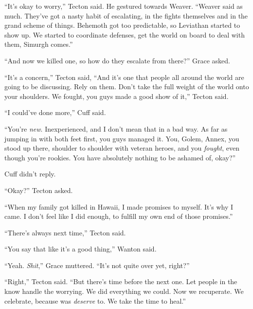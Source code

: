 ``It's okay to worry,'' Tecton said.  He gestured towards Weaver.  ``Weaver said as much.  They've got a nasty habit of escalating, in the fights themselves and in the grand scheme of things.  Behemoth got too predictable, so Leviathan started to show up.  We started to coordinate defenses, get the world on board to deal with them, Simurgh comes.''



``And now we killed one, so how do they escalate from there?'' Grace asked.



``It's a concern,'' Tecton said, ``And it's one that people all around the world are going to be discussing.  Rely on them.  Don't take the full weight of the world onto your shoulders.  We fought, you guys made a good show of it,'' Tecton said.



``I could've done more,'' Cuff said.



``You're \emph{new}.  Inexperienced, and I don't mean that in a bad way.  As far as jumping in with both feet first, you guys managed it.  You, Golem, Annex, you stood up there, shoulder to shoulder with veteran heroes, and you \emph{fought}, even though you're rookies.  You have absolutely nothing to be ashamed of, okay?''



Cuff didn't reply.



``Okay?'' Tecton asked.



``When my family got killed in Hawaii, I made promises to myself.  It's why I came.  I don't feel like I did enough, to fulfill my own end of those promises.''



``There's always next time,'' Tecton said.



``You say that like it's a good thing,'' Wanton said.



``Yeah.  \emph{Shit},'' Grace muttered.  ``It's not quite over yet, right?''



``Right,'' Tecton said.  ``But there's time before the next one.  Let people in the know handle the worrying.  We did everything we could.  Now we recuperate.  We celebrate, because was \emph{deserve} to.  We take the time to heal.''



